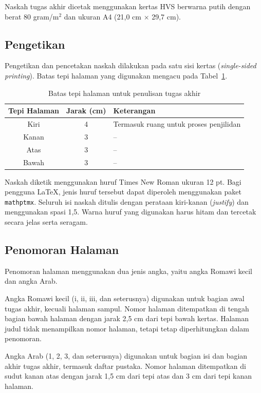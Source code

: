 Naskah tugas akhir dicetak menggunakan kertas HVS berwarna putih dengan berat 80 gram/m$^2$ dan ukuran A4 (21,0 cm $\times$ 29,7 cm).

\subsection{Pengetikan}

Pengetikan dan pencetakan naskah dilakukan pada satu sisi kertas (\textit{single-sided printing}). Batas tepi halaman yang digunakan mengacu pada Tabel~\ref{tab:pengetikan}.

\begin{table}[!ht]
\centering
\caption{Batas tepi halaman untuk penulisan tugas akhir}
\label{tab:pengetikan}
\begin{tabular}{|c|c|p{}|}
\hline
\textbf{Tepi Halaman} & \textbf{Jarak (cm)} & \textbf{Keterangan} \\
\hline
Kiri & 4 & Termasuk ruang untuk proses penjilidan \\
\hdashline
Kanan & 3 & -- \\
\hdashline
Atas & 3 & -- \\
\hdashline
Bawah & 3 & -- \\
\hline
\end{tabular}
\end{table}

Naskah diketik menggunakan huruf Times New Roman ukuran 12 pt. Bagi pengguna \LaTeX, jenis huruf tersebut dapat diperoleh menggunakan paket \texttt{mathptmx}. Seluruh isi naskah ditulis dengan perataan kiri-kanan (\textit{justify}) dan menggunakan spasi 1,5. Warna huruf yang digunakan harus hitam dan tercetak secara jelas serta seragam.

\subsection{Penomoran Halaman}

Penomoran halaman menggunakan dua jenis angka, yaitu angka Romawi kecil dan angka Arab.

Angka Romawi kecil (i, ii, iii, dan seterusnya) digunakan untuk bagian awal tugas akhir, kecuali halaman sampul. Nomor halaman ditempatkan di tengah bagian bawah halaman dengan jarak 2,5 cm dari tepi bawah kertas. Halaman judul tidak menampilkan nomor halaman, tetapi tetap diperhitungkan dalam penomoran.

Angka Arab (1, 2, 3, dan seterusnya) digunakan untuk bagian isi dan bagian akhir tugas akhir, termasuk daftar pustaka. Nomor halaman ditempatkan di sudut kanan atas dengan jarak 1,5 cm dari tepi atas dan 3 cm dari tepi kanan halaman.

